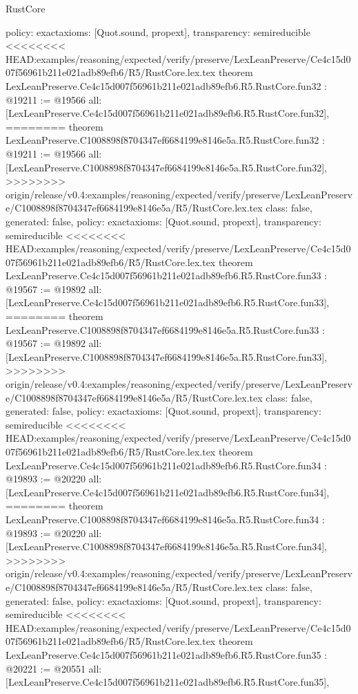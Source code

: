 \begin{lexlean}{RustCore}
\begin{coremodule}
{\begin{coremodule}
{{{{{{{{{{{{{{{{{{{{{{{{{{{{{{{{{{{  policy: exact{axioms: [Quot.sound, propext]},
  transparency: semireducible
}
<<<<<<<< HEAD:examples/reasoning/expected/verify/preserve/LexLeanPreserve/Ce4c15d007f56961b211e021adb89efb6/R5/RustCore.lex.tex
theorem LexLeanPreserve.Ce4c15d007f56961b211e021adb89efb6.R5.RustCore.fun32 : @19211 := @19566 {
  all: [LexLeanPreserve.Ce4c15d007f56961b211e021adb89efb6.R5.RustCore.fun32],
========
theorem LexLeanPreserve.C1008898f8704347ef6684199e8146e5a.R5.RustCore.fun32 : @19211 := @19566 {
  all: [LexLeanPreserve.C1008898f8704347ef6684199e8146e5a.R5.RustCore.fun32],
>>>>>>>> origin/release/v0.4:examples/reasoning/expected/verify/preserve/LexLeanPreserve/C1008898f8704347ef6684199e8146e5a/R5/RustCore.lex.tex
  class: false,
  generated: false,
  policy: exact{axioms: [Quot.sound, propext]},
  transparency: semireducible
}
<<<<<<<< HEAD:examples/reasoning/expected/verify/preserve/LexLeanPreserve/Ce4c15d007f56961b211e021adb89efb6/R5/RustCore.lex.tex
theorem LexLeanPreserve.Ce4c15d007f56961b211e021adb89efb6.R5.RustCore.fun33 : @19567 := @19892 {
  all: [LexLeanPreserve.Ce4c15d007f56961b211e021adb89efb6.R5.RustCore.fun33],
========
theorem LexLeanPreserve.C1008898f8704347ef6684199e8146e5a.R5.RustCore.fun33 : @19567 := @19892 {
  all: [LexLeanPreserve.C1008898f8704347ef6684199e8146e5a.R5.RustCore.fun33],
>>>>>>>> origin/release/v0.4:examples/reasoning/expected/verify/preserve/LexLeanPreserve/C1008898f8704347ef6684199e8146e5a/R5/RustCore.lex.tex
  class: false,
  generated: false,
  policy: exact{axioms: [Quot.sound, propext]},
  transparency: semireducible
}
<<<<<<<< HEAD:examples/reasoning/expected/verify/preserve/LexLeanPreserve/Ce4c15d007f56961b211e021adb89efb6/R5/RustCore.lex.tex
theorem LexLeanPreserve.Ce4c15d007f56961b211e021adb89efb6.R5.RustCore.fun34 : @19893 := @20220 {
  all: [LexLeanPreserve.Ce4c15d007f56961b211e021adb89efb6.R5.RustCore.fun34],
========
theorem LexLeanPreserve.C1008898f8704347ef6684199e8146e5a.R5.RustCore.fun34 : @19893 := @20220 {
  all: [LexLeanPreserve.C1008898f8704347ef6684199e8146e5a.R5.RustCore.fun34],
>>>>>>>> origin/release/v0.4:examples/reasoning/expected/verify/preserve/LexLeanPreserve/C1008898f8704347ef6684199e8146e5a/R5/RustCore.lex.tex
  class: false,
  generated: false,
  policy: exact{axioms: [Quot.sound, propext]},
  transparency: semireducible
}
<<<<<<<< HEAD:examples/reasoning/expected/verify/preserve/LexLeanPreserve/Ce4c15d007f56961b211e021adb89efb6/R5/RustCore.lex.tex
theorem LexLeanPreserve.Ce4c15d007f56961b211e021adb89efb6.R5.RustCore.fun35 : @20221 := @20551 {
  all: [LexLeanPreserve.Ce4c15d007f56961b211e021adb89efb6.R5.RustCore.fun35],
}}}}}}}}}}}}}}}}}}}}}}}}}}}}}}}}}}}}}}
\end{coremodule}}
\end{coremodule}
\end{lexlean}
